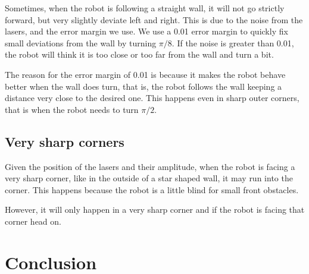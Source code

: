 \documentclass[10pt,journal,compsoc]{IEEEtran}
\begin{document}
Sometimes, when the robot is following a straight wall, it will not go strictly forward, but very slightly deviate left and right. This is due to the noise from the lasers, and the error margin we use. We use a 0.01 error margin to quickly fix small deviations from the wall by turning $\pi/8$. If the noise is greater than 0.01, the robot will think it is too close or too far from the wall and turn a bit.

The reason for the error margin of 0.01 is because it makes the robot behave better when the wall does turn, that is, the robot follows the wall keeping a distance very close to the desired one. This happens even in sharp outer corners, that is when the robot needs to turn $\pi/2$.

\subsection{Very sharp corners}

Given the position of the lasers and their amplitude, when the robot is facing a very sharp corner, like in the outside of a star shaped wall, it may run into the corner. This happens because the robot is a little blind for small front obstacles.

However, it will only happen in a very sharp corner and if the robot is facing that corner head on.


\section{Conclusion}




\ifCLASSOPTIONcaptionsoff
\newpage
\fi

%
%
\end{document}
